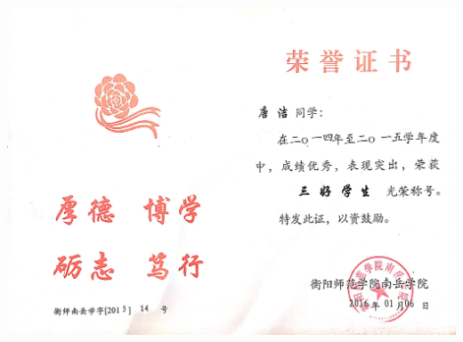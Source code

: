 \documentclass[UFT8]{ctexart}%
\begin{document}
\begin{center}
 \includegraphics[scale=0.1]{figs/20160106_2.JPG }
\end{center}
\end{document}
